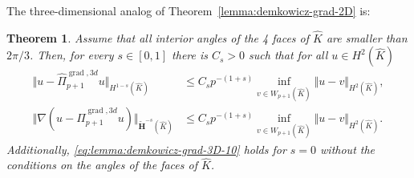 \documentclass{article}
\newtheorem{theorem}{Theorem}[section]
\newcommand{\hatPigradcom}{\widehat\Pi^{\operatorname*{grad},3d}_{p+1}}
\begin{document}
The three-dimensional analog of Theorem~\ref{lemma:demkowicz-grad-2D} is: 

\begin{theorem}
\label{lemma:demkowicz-grad-3D}
Assume that all interior angles of the 4 faces of $\widehat K$ are smaller than $2\pi/3$. Then, 
for every $s\in [0,1]$ 
there is $C_s > 0$ such that 
for all $u\in H^2(\widehat{K})$
\begin{subequations}
\begin{align}
\label{eq:lemma:demkowicz-grad-3D-10}
\Vert u-\hatPigradcom u\Vert_{H^{1-s}(\widehat{K})}&\leq
C_{s}p^{-(1+s)} \inf_{v \in W_{p+1}(\widehat K)} \Vert u -v\Vert_{H^{2}(\widehat{K})}, \\
\label{eq:lemma:demkowicz-grad-3D-20}
\Vert \nabla(u-\hatPigradcom u)\Vert_{\widetilde{\mathbf{H}}^{-s}(\widehat{K})}&\leq
C_{s}p^{-(1+s)} \inf_{v \in W_{p+1}(\widehat K)} \Vert u -v\Vert_{H^{2}(\widehat{K})}.
\end{align}
\end{subequations}
Additionally, \eqref{eq:lemma:demkowicz-grad-3D-10} holds for  $s = 0$ without the conditions on the 
angles of the faces of $\widehat K$. 
\end{theorem}
\end{document}
